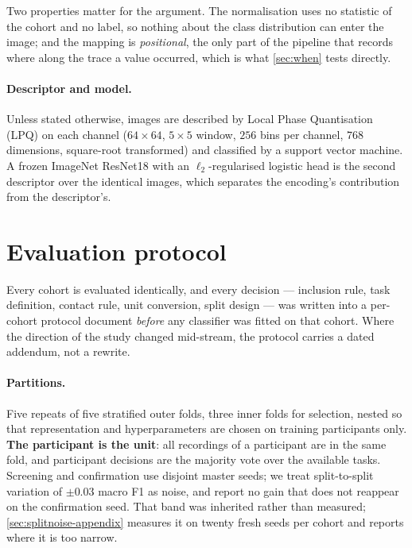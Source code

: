 \documentclass{article}
\begin{document}
Two properties matter for the argument. The normalisation uses no statistic of the cohort and no
label, so nothing about the class distribution can enter the image; and the mapping is
\emph{positional}, the only part of the pipeline that records where along the trace a value
occurred, which is what \cref{sec:when} tests directly.

\paragraph{Descriptor and model.} Unless stated otherwise, images are described by Local Phase
Quantisation (LPQ) \citep{ojansivu2008lpq} on each channel ($64 \times 64$, $5\times 5$ window,
$256$ bins per channel, $768$ dimensions, square-root transformed) and classified by a support
vector machine. A frozen ImageNet ResNet18 \citep{he2016resnet} with an $\ell_2$-regularised
logistic head is the second descriptor over the identical images, which separates the encoding's
contribution from the descriptor's.

\section{Evaluation protocol}
\label{sec:protocol}

Every cohort is evaluated identically, and every decision --- inclusion rule, task definition,
contact rule, unit conversion, split design --- was written into a per-cohort protocol document
\emph{before} any classifier was fitted on that cohort. Where the direction of the study changed
mid-stream, the protocol carries a dated addendum, not a rewrite.

\paragraph{Partitions.} Five repeats of five stratified outer folds, three inner folds for
selection, nested so that representation and hyperparameters are chosen on training participants
only. \textbf{The participant is the unit}: all recordings of a participant are in the same fold,
and participant decisions are the majority vote over the available tasks. Screening and
confirmation use disjoint master seeds; we treat split-to-split variation of $\pm 0.03$ macro F1 as
noise, and report no gain that does not reappear on the confirmation seed. That band was inherited
rather than measured; \cref{sec:splitnoise-appendix} measures it on twenty fresh seeds per cohort
and reports where it is too narrow.
\end{document}
